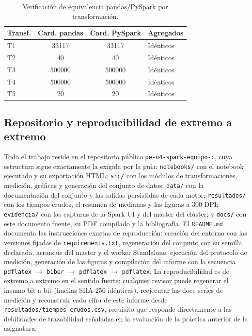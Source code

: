 \documentclass[10pt,journal]{IEEEtran}
\begin{document}
\begin{table}[!t]
\centering
\caption{Verificaci\'on de equivalencia pandas/PySpark por transformaci\'on.}
\label{tab:equivalencia}
\footnotesize
\begin{tabular}{@{}lS[table-format=6.0]S[table-format=6.0]l@{}}
\toprule
\textbf{Transf.} & {\textbf{Card. pandas}} & {\textbf{Card. PySpark}} & \textbf{Agregados}\\
\midrule
T1 & 33117  & 33117  & Id\'enticos\\
T2 & 40     & 40     & Id\'enticos\\
T3 & 500000 & 500000 & Id\'enticos\\
T4 & 500000 & 500000 & Id\'enticos\\
T5 & 20     & 20     & Id\'enticos\\
\bottomrule
\end{tabular}
\end{table}

\subsection{Repositorio y reproducibilidad de extremo a extremo}
\label{sec:repositorio}
Todo el trabajo reside en el repositorio p\'ublico
\texttt{pe-u4-spark-equipo-c}, cuya estructura sigue exactamente la exigida por
la gu\'ia: \texttt{notebooks/} con el notebook ejecutado y su exportaci\'on
HTML; \texttt{src/} con los m\'odulos de transformaciones, medici\'on,
gr\'aficas y generaci\'on del conjunto de datos; \texttt{data/} con la
documentaci\'on del conjunto y las salidas persistidas de cada motor;
\texttt{resultados/} con los tiempos crudos, el resumen de medianas y las
figuras a \num{300} DPI; \texttt{evidencia/} con las capturas de la Spark UI y
del master del cl\'uster; y \texttt{docs/} con este documento fuente, su PDF
compilado y la bibliograf\'ia. El \texttt{README.md} documenta las
instrucciones exactas de reproducci\'on: creaci\'on del entorno con las
versiones fijadas de \texttt{requirements.txt}, regeneraci\'on del conjunto con
su semilla declarada, arranque del master y el worker Standalone, ejecuci\'on
del protocolo de medici\'on, generaci\'on de las figuras y compilaci\'on del
informe con la secuencia \texttt{pdflatex} $\rightarrow$ \texttt{biber}
$\rightarrow$ \texttt{pdflatex} $\rightarrow$ \texttt{pdflatex}. La
reproducibilidad es de extremo a extremo en el sentido fuerte: cualquier
revisor puede regenerar el insumo bit a bit (huellas SHA-256 id\'enticas),
reejecutar las doce series de medici\'on y reconstruir cada cifra de este
informe desde \texttt{resultados/tiempos\_crudos.csv}, requisito que responde
directamente a las debilidades de trazabilidad se\~naladas en la evaluaci\'on
de la pr\'actica anterior de la asignatura.
\end{document}
